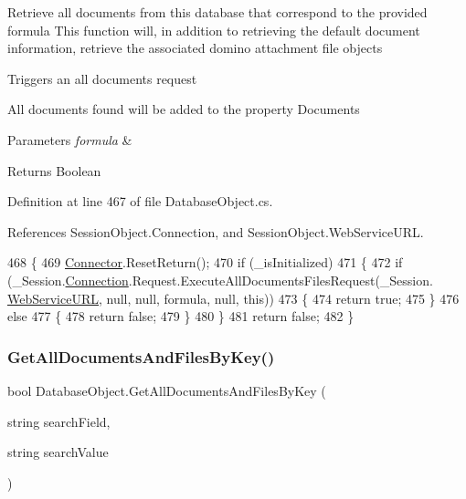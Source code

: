 Retrieve all documents from this database that correspond to the provided formula This function will, in addition to retrieving the default document information, retrieve the associated domino attachment file objects 

Triggers an all documents request

All documents found will be added to the property \textquotesingle{}Documents\textquotesingle{}


\begin{DoxyParams}{Parameters}
{\em formula} & \\
\hline
\end{DoxyParams}
\begin{DoxyReturn}{Returns}
Boolean
\end{DoxyReturn}


Definition at line 467 of file Database\+Object.\+cs.



References Session\+Object.\+Connection, and Session\+Object.\+Web\+Service\+U\+RL.


\begin{DoxyCode}
468     \{
469         \mbox{\hyperlink{class_connector}{Connector}}.ResetReturn();
470         \textcolor{keywordflow}{if} (\_isInitialized)
471         \{
472             \textcolor{keywordflow}{if} (\_Session.\mbox{\hyperlink{class_session_object_a014bdbf705a753540e19bfb53030c55c}{Connection}}.Request.ExecuteAllDocumentsFilesRequest(\_Session.
      \mbox{\hyperlink{class_session_object_a697c071c812fbf7ad1166b896fb44c16}{WebServiceURL}}, null, null, formula, null, \textcolor{keyword}{this}))
473             \{
474                 \textcolor{keywordflow}{return} \textcolor{keyword}{true};
475             \}
476             \textcolor{keywordflow}{else}
477             \{
478                 \textcolor{keywordflow}{return} \textcolor{keyword}{false};
479             \}
480         \}
481         \textcolor{keywordflow}{return} \textcolor{keyword}{false};
482     \}
\end{DoxyCode}
\mbox{\label{class_database_object_a6c2fb05fb6972d74d5bea67e323985fb}} 
\subsubsection{\texorpdfstring{Get\+All\+Documents\+And\+Files\+By\+Key()}{GetAllDocumentsAndFilesByKey()}}
{\footnotesize\ttfamily bool Database\+Object.\+Get\+All\+Documents\+And\+Files\+By\+Key (\begin{DoxyParamCaption}\item[{string}]{search\+Field,  }\item[{string}]{search\+Value }\end{DoxyParamCaption})}



